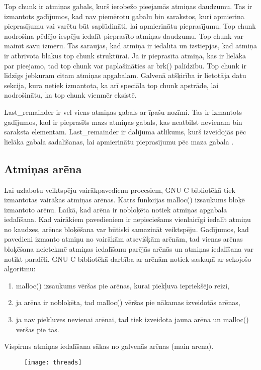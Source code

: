 Top chunk ir atmiņas gabals, kurš ierobežo pieejamās atmiņas daudzumu.
Tas ir izmantots gadījumos, kad nav piemērotu gabalu bin sarakstos, kuri apmierina pieprasījumu vai varētu būt saplūdināti, lai apmierinātu pieprasījumu.
Top chunk nodrošina pēdējo iespēju iedalīt pieprasīto atmiņas daudzumu.
Top chunk var mainīt savu izmēru. Tas saraujas, kad atmiņa ir iedalīta un izstiepjas, kad atmiņa ir atbrīvota blakus top chunk struktūrai. 
Ja ir pieprasīta atmiņa, kas ir lielāka par pieejamo, tad top chunk var paplašināties ar brk() palīdzību.
Top chunk ir līdzīgs jebkuram citam atmiņas apgabalam. 
Galvenā atšķirība ir lietotāja datu sekcija, kura netiek izmantota, ka arī speciāla top chunk apstrāde, lai nodrošinātu, ka top chunk vienmēr eksistē.

Last\_remainder ir vel viens atmiņas gabals ar īpašu nozīmi.
Tas ir izmantots gadījumos, kad ir pieprasīts mazs atmiņas gabals, kas neatbilst nevienam bin saraksta elementam. 
Last\_remainder ir dalījuma atlikums, kurš izveidojās pēc lielāka gabala sadalīšanas, lai apmierinātu pieprasījumu pēc maza gabala  \cite {BLACKHAT}.

\subsection{Atmiņas arēna}

Lai uzlabotu veiktspēju vairākpavedienu procesiem, GNU C bibliotēkā tiek izmantotas vairākas atmiņas arēnas. 
Katrs funkcijas malloc() izsaukums bloķē izmantoto arēnu. Laikā, kad arēna ir nobloķēta notiek atmiņas apgabala iedalīšana.
Kad vairākiem pavedieniem ir nepieciešams vienlaicīgi iedalīt atmiņu no kaudzes, arēnas bloķēšana var būtiski samazināt veiktspēju.
Gadījumos, kad pavedieni izmanto atmiņu no vairākām atsevišķām arēnām, tad vienas arēnas bloķēšana neietekmē atmiņas iedalīšanu parējās arēnās un atmiņas iedalīšana var notikt paralēli.
GNU C bibliotēkā darbība ar arēnām notiek saskaņā ar sekojošo algoritmu: 

\begin{enumerate}
\item malloc() izsaukums vēršas pie arēnas, kurai piekļuva iepriekšējo reizi,
\item ja arēna ir nobloķēta, tad malloc() vēršas pie nākamas izveidotās arēnas,
\item ja nav piekļuves nevienai arēnai, tad tiek izveidota jauna arēna un malloc() vēršas pie tās.
\end{enumerate}
Vispirms atmiņas iedalīšana sākas no galvenās arēnas (main arena). 
\begin{figure}[h]
\begin{center}
\texttt{[image: threads]}
\end{center}
\caption{\textbf{\fontsize{11}{12}\selectfont {Arēnas GNU C bibliotēkā }}}
\end{figure}

